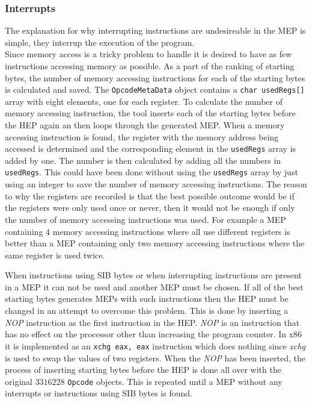 \documentclass[11pt,twoside]{eitExjobb}
\begin{document}
\subsubsection{Interrupts}
The explanation for why interrupting instructions are undesireable in the MEP is simple, they interrup the execution of the program. \\

\noindent Since memory access is a tricky problem to handle it is desired to have as few instructions accessing memory as possible. As a part of the ranking of starting bytes, the number of memory accessing instructions for each of the starting bytes is calculated and saved. The \texttt{OpcodeMetaData} object contains a \texttt{char usedRegs[]} array with eight elements, one for each register. To calculate the number of memory accessing instruction, the tool inserts each of the starting bytes before the HEP again an then loops through the generated MEP. When a memory accessing instruction is found, the register with the memory address being accessed is determined and the corresponding element in the \texttt{usedRegs} array is added by one. The number is then calculated by adding all the numbers in \texttt{usedRegs}. This could have been done without using the \texttt{usedRegs} array by just using an integer to save the number of memory accessing instructions. The reason to why the registers are recorded is that the best possible outcome would be if the registers were only used once or never, then it would not be enough if only the number of memory accessing instructions was used. For example a MEP containing 4 memory accessing instructions where all use different registers is better than a MEP containing only two memory accessing instructions where the same register is used twice.

When instructions using SIB bytes or when interrupting instructions are present in a MEP it can not be used and another MEP must be chosen. If all of the best starting bytes generates MEPs with such instructions then the HEP must be changed in an attempt to overcome this problem. This is done by inserting a \emph{NOP} instruction as the first instruction in the HEP. \emph{NOP} is an instruction that has no effect on the processor other than increasing the program counter. In x86 it is implemented as an \texttt{xchg eax, eax} instruction which does nothing since \emph{xchg} is used to swap the values of two registers. When the \emph{NOP} has been inserted, the process of inserting starting bytes before the HEP is done all over with the original $3316228$ \texttt{Opcode} objects. This is repeated until a MEP without any interrupts or instructions using SIB bytes is found.
\end{document}
